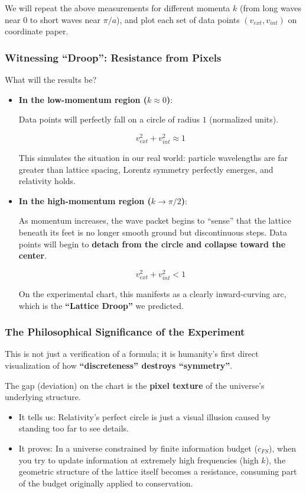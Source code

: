 We will repeat the above measurements for different momenta $k$ (from long waves near 0 to short waves near $\pi/a$), and plot each set of data points $(v_{ext}, v_{int})$ on coordinate paper.

\subsubsection{Witnessing ``Droop'': Resistance from Pixels}

What will the results be?

\begin{itemize}
\item \textbf{In the low-momentum region ($k \approx 0$)}:

    Data points will perfectly fall on a circle of radius $1$ (normalized units).

    \[v_{ext}^2 + v_{int}^2 \approx 1\]

    This simulates the situation in our real world: particle wavelengths are far greater than lattice spacing, Lorentz symmetry perfectly emerges, and relativity holds.

\item \textbf{In the high-momentum region ($k \to \pi/2$)}:

    As momentum increases, the wave packet begins to ``sense'' that the lattice beneath its feet is no longer smooth ground but discontinuous steps. Data points will begin to \textbf{detach from the circle and collapse toward the center}.

    \[v_{ext}^2 + v_{int}^2 < 1\]

    On the experimental chart, this manifests as a clearly inward-curving arc, which is the \textbf{``Lattice Droop''} we predicted.
\end{itemize}

\subsubsection{The Philosophical Significance of the Experiment}

This is not just a verification of a formula; it is humanity's first direct visualization of how \textbf{``discreteness'' destroys ``symmetry''}.

The gap (deviation) on the chart is the \textbf{pixel texture} of the universe's underlying structure.

\begin{itemize}
\item It tells us: Relativity's perfect circle is just a visual illusion caused by standing too far to see details.

\item It proves: In a universe constrained by finite information budget ($c_{FS}$), when you try to update information at extremely high frequencies (high $k$), the geometric structure of the lattice itself becomes a resistance, consuming part of the budget originally applied to conservation.
\end{itemize}

